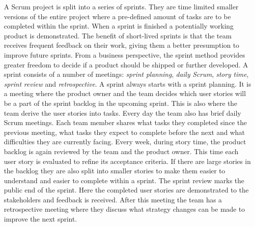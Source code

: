A Scrum project is split into a series of sprints. They are time limited
smaller versions of the entire project where a pre-defined amount of tasks are
to be completed within the sprint. When a sprint is finished a potentially
working product is demonstrated. The benefit of short-lived sprints is that the
team receives frequent feedback on their work, giving them a better presumption
to improve future sprints. From a business perspective, the sprint method
provides greater freedom to decide if a product should be shipped or further
developed. A sprint consists of a number of meetings: \textit{sprint planning},
\textit{daily Scrum}, \textit{story time}, \textit{sprint review} and
\textit{retrospective}. A sprint always starts with a sprint planning. It is a
meeting where the product owner and the team decides which user stories will be
a part of the sprint backlog in the upcoming sprint. This is also where the
team derive the user stories into tasks. Every day the team also has brief
daily Scrum meetings. Each team member shares what tasks they completed since
the previous meeting, what tasks they expect to complete before the next and
what difficulties they are currently facing. Every week, during story time, the
product backlog is again reviewed by the team and the product owner. This time
each user story is evaluated to refine its acceptance criteria. If there are
large stories in the backlog they are also split into smaller stories to make
them easier to understand and easier to complete within a sprint. The sprint
review marks the public end of the sprint. Here the completed user stories are
demonstrated to the stakeholders and feedback is received. After this meeting
the team has a retrospective meeting where they discuss what strategy changes
can be made to improve the next sprint. \cite{sims2012scrum}

